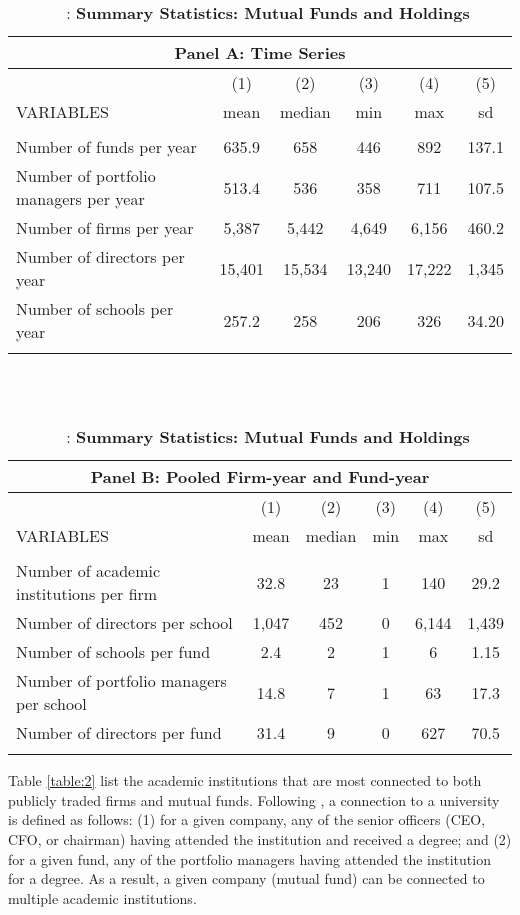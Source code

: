 \documentclass[11pt]{article}
\begin{document}
\begin{doublespace}
\begin{table}
\caption{ \ \ : \large \bf Summary Statistics: Mutual Funds and Holdings}
\vspace*{10mm}
\begin{tabular}{lccccc}
\multicolumn{6}{c}{Panel A: Time Series} \\ \hline
 & (1) & (2) & (3) & (4) & (5) \\
VARIABLES & mean & median & min & max & sd \\ \hline
 &  &  &  &  &  \\
Number of funds per year & 635.9 & 658 & 446 & 892 & 137.1 \\
Number of portfolio managers per year & 513.4 & 536 & 358 & 711 & 107.5 \\
Number of firms per year & 5,387 & 5,442 & 4,649 & 6,156 & 460.2 \\
Number of directors per year & 15,401 & 15,534 & 13,240 & 17,222 & 1,345 \\
Number of schools per year & 257.2 & 258 & 206 & 326 & 34.20 \\
 &  &  &  &  &  \\ \hline
\end{tabular}
\\
\vspace*{10mm}
\\
\begin{tabular}{lccccc}
\multicolumn{6}{c}{Panel B: Pooled Firm-year and Fund-year} \\ \hline
 & (1) & (2) & (3) & (4) & (5) \\
VARIABLES & mean & median & min & max & sd \\ \hline
 &  &  &  &  &  \\
Number of academic institutions per firm & 32.8 & 23 & 1 & 140 & 29.2 \\
Number of directors per school & 1,047 & 452 & 0 & 6,144 & 1,439 \\
Number of schools per fund & 2.4 & 2 & 1 & 6 & 1.15 \\
Number of portfolio managers per school & 14.8 & 7 & 1 & 63 & 17.3 \\
Number of directors per fund & 31.4 & 9 & 0 & 627 & 70.5 \\
 &  &  &  &  &  \\ \hline
\end{tabular}
\vspace*{10mm}
\label{table:1}
\end{table}

Table \ref{table:2} list the academic institutions that are most connected to both publicly traded firms and mutual funds. Following \cite{cohen2008small}, a connection to a university is defined as follows: (1) for a given company, any of the senior officers (CEO, CFO, or chairman) having attended the institution and received a degree; and (2) for a given fund, any of the portfolio managers having attended the institution for a degree. As a result, a given company (mutual fund) can be connected to multiple academic institutions. 


\end{doublespace}
\end{document}
